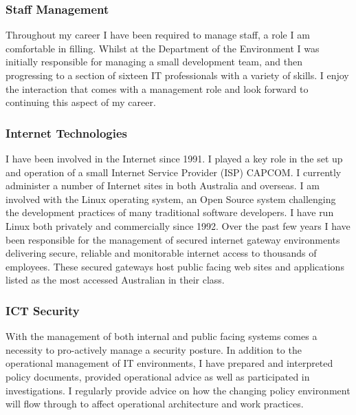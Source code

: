\documentclass[]{friggeri-cv} %
\begin{document}
\subsubsection*{Staff Management}
Throughout my career I have been required to manage staff, a role I am comfortable in filling. Whilst at the Department of the Environment I was initially responsible for managing a small development team, and then progressing to a section of sixteen IT professionals with a variety of skills. I enjoy the interaction that comes with a management role and look forward to continuing this aspect of my career.

\subsubsection*{Internet Technologies}
I have been involved in the Internet since 1991. I played a key role in the set up and operation of a small Internet Service Provider (ISP) CAPCOM. I currently administer a number of Internet sites in both Australia and overseas. I am involved with the Linux operating system, an Open Source system challenging the development practices of many traditional software developers. I have run Linux both privately and commercially since 1992. Over the past few years I have been responsible for the management of secured internet gateway environments delivering secure, reliable and monitorable internet access to thousands of employees. These secured gateways host public facing web sites and applications listed as the most accessed Australian in their class.

\subsubsection*{ICT Security}
With the management of both internal and public facing systems comes a necessity to pro-actively manage a security posture. In addition to the operational management of IT environments, I have prepared and interpreted policy documents, provided operational advice as well as participated in investigations. I regularly provide advice on how the changing policy environment will flow through to affect operational architecture and work practices.
\end{document}
